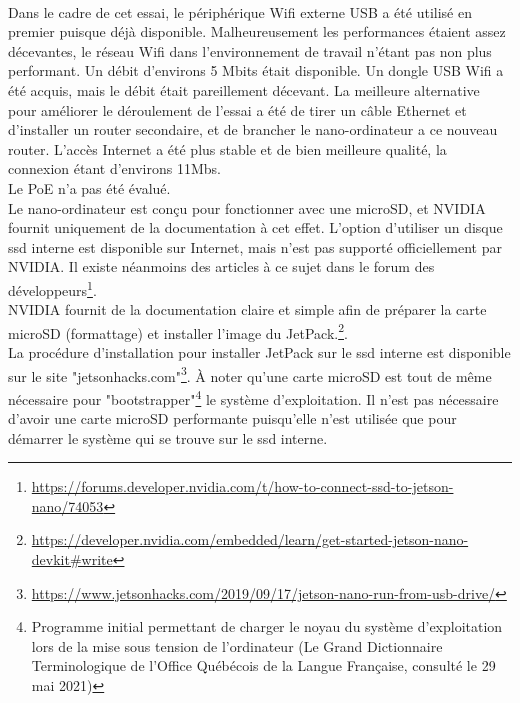 \vspace{0.5\baselineskip}
\\
\noindent Dans le cadre de cet essai, le périphérique Wifi externe USB a été utilisé en premier puisque déjà disponible. Malheureusement les performances étaient assez décevantes, le réseau Wifi dans l'environnement de travail n'étant pas non plus performant. Un débit d'environs 5 Mbits était disponible. Un dongle USB Wifi a été acquis, mais le débit était pareillement décevant. La meilleure alternative pour améliorer le déroulement de l'essai a été de tirer un câble Ethernet et d'installer un router secondaire, et de brancher le nano-ordinateur a ce nouveau router. L'accès Internet a été plus stable et de bien meilleure qualité, la connexion étant d'environs 11Mbs. 
\vspace{0.5\baselineskip}
\\
\noindent Le PoE n'a pas été évalué. 
\vspace{0.5\baselineskip}
\\
Le nano-ordinateur est conçu pour fonctionner avec une microSD, et NVIDIA fournit uniquement de la documentation à cet effet. L'option d'utiliser un disque \acrshort{ssd} interne est disponible sur Internet, mais n'est pas supporté officiellement par NVIDIA. Il existe néanmoins des articles à ce sujet dans le forum des développeurs\footnote{\url{https://forums.developer.nvidia.com/t/how-to-connect-ssd-to-jetson-nano/74053}}. 
\vspace{0.5\baselineskip}
\\
\noindent NVIDIA fournit de la documentation claire et simple afin de préparer la carte microSD (formattage) et installer l'image du JetPack.\footnote{\url{https://developer.nvidia.com/embedded/learn/get-started-jetson-nano-devkit#write}}.
\vspace{0.5\baselineskip}
\\
\noindent La procédure d'installation pour installer JetPack sur le \acrshort{ssd} interne est disponible sur le site "jetsonhacks.com"\footnote{\url{https://www.jetsonhacks.com/2019/09/17/jetson-nano-run-from-usb-drive/}}. À noter qu'une carte microSD est tout de même nécessaire pour "bootstrapper"\footnote{Programme initial permettant de charger le noyau du système d'exploitation lors de la mise sous tension de l'ordinateur (Le Grand Dictionnaire Terminologique de l'Office Québécois de la Langue Française, consulté le 29 mai 2021)} le système d'exploitation. Il n'est pas nécessaire d'avoir une carte microSD performante puisqu'elle n'est utilisée que pour démarrer le système qui se trouve sur le \acrshort{ssd} interne. 
